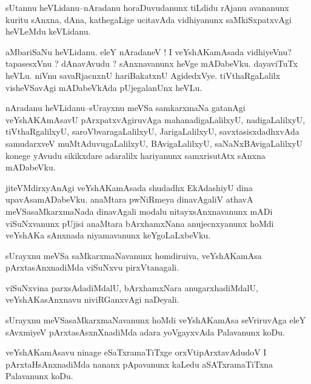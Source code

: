 \documentclass{article}
\begin{document}
\begin{mn}%
sUtannu heVLidanu--nAradanu horaDuvudanunx tiLdidu rAjanu avananunx kuritu sAnxna, dAna, 
kathegaLige ucitavAda vidhiyanunx saMkiSxpatxvAgi heVLeMdu keVLidanu.
\end{mn}

\begin{mn}%
aMbariSaNu heVLidanu. eleY nAradaneV ! I veYshAKamAsada vidhiyeVnu? tapasesxVnu ? 
dAnavAvudu ? sAnxnavanunx heVge mADabeVku. dayaviTuTx heVLu. niVnu savaRjacnxnU 
hariBakatxnU AgidedxVye. tiVthaRgaLalilx visheVSavAgi mADabeVkAda pUjegalanUnx heVLu.
\end{mn}

\begin{mn}%
nAradanu heVLidanu--sUrayxnu meVSa samkarxmaNa gatanAgi veYshAKAmAsavU pArxpatxvAgiruvAga 
mahanadigaLalilxyU, nadigaLalilxyU, tiVthaRgalilxyU, saroVbvaragaLalilxyU, 
JarigaLalilxyU, savxtasisxdadhxvAda samudarxveV muMtAduvugaLalilxyU, BAvigaLalilxyU, 
saNaNxBAvigaLalilxyU konege yAvudu sikikxdare adaralilx hariyanunx samxrisutAtx sAnxna 
mADabeVku.
\end{mn}

\begin{mn}%
jiteVMdirxyAnAgi veYshAKamAsada shudadhx EkAdashiyU dina upavAsamADabeVku. anaMtara 
pwNiRmeya dinavAgaliV athavA meVSasaMkarxmaNada dinavAgali modalu nitayxsAnxnavanunx mADi 
viSuNxvanunx pUjisi anaMtara bArxhamxNana anujecnxyanunx hoMdi veYshAKa sAnxnada 
niyamavanunx keYgoLaLxbeVku.
\end{mn}

\begin{mn}%
sUrayxnu meVSa saMkarxmaNavanunx homdiruiva, veYshAKamAsa pArxtasAnxnadiMda viSuNxvu 
pirxVtanagali.
\end{mn}

\begin{mn}%
viSuNxvina parxsAdadiMdalU, bArxhamxNara anugarxhadiMdalU, veYshAKasAnxnavu niviRGanxvAgi 
naDeyali.
\end{mn}

\begin{mn}%
sUrayxnu meVSasaMkarxmaNavanunx hoMdi veYshAKamAsa seVriruvAga eleY sAvxmiyeV 
pArxtasAsxnXnadiMda adara yoVgayxvAda Palavanunx koDu.
\end{mn}

\begin{mn}%
veYshAKamAsavu ninage eSaTxramaTiTxge orxVtipArxtavAdudoV I pArxtaHsAnxnadiMda nananx 
pApavanunx  kaLedu aSATxramaTiTxna Palavanunx koDu.
\end{mn}
\end{document}
